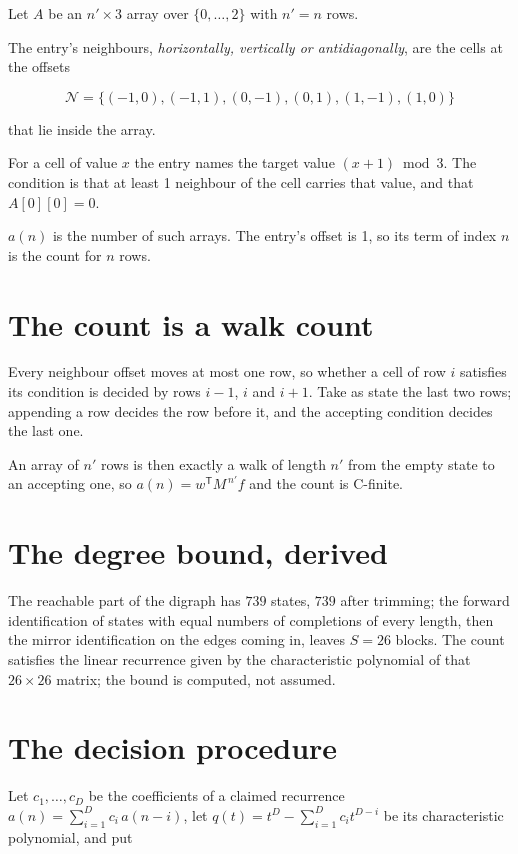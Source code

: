 \documentclass[11pt]{article}
\theoremstyle{definition}
\begin{document}
Let $A$ be an $n' \times 3$ array over $\{0,\dots,2\}$ with $n' = n$ rows.

The entry's neighbours, {\itshape horizontally, vertically or antidiagonally}, are the cells at the offsets

\[\mathcal{N} = \{(-1,0), (-1,1), (0,-1), (0,1), (1,-1), (1,0)\}\]

that lie inside the array.

For a cell of value $x$ the entry names the target value $(x + 1) \bmod 3$. The condition is that at least 1 neighbour of the cell carries that value, and that $A[0][0] = 0$.

$a(n)$ is the number of such arrays. The entry's offset is 1, so its term of index $n$ is the count for $n$ rows.

\section{The count is a walk count}

Every neighbour offset moves at most one row, so whether a cell of row $i$ satisfies its condition is decided by rows $i-1$, $i$ and $i+1$. Take as state the last two rows; appending a row decides the row before it, and the accepting condition decides the last one.

An array of $n'$ rows is then exactly a walk of length $n'$ from the empty state to an accepting one, so $a(n) = w^{\mathsf T}M^{\,n'}f$ and the count is C-finite.

\section{The degree bound, derived}

The reachable part of the digraph has $739$ states, $739$ after trimming; the forward identification of states with equal numbers of completions of every length, then the mirror identification on the edges coming in, leaves $S = 26$ blocks. The count satisfies the linear recurrence given by the characteristic polynomial of that $26\times26$ matrix; the bound is computed, not assumed.

\section{The decision procedure}

Let $c_1,\dots,c_D$ be the coefficients of a claimed recurrence $a(n) = \sum_{i=1}^{D} c_i\,a(n-i)$, let $q(t) = t^{D} - \sum_{i=1}^{D} c_i t^{D-i}$ be its characteristic polynomial, and put
\end{document}

